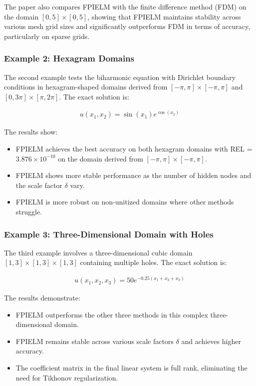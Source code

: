 \documentclass[11pt]{article}
\begin{document}
The paper also compares FPIELM with the finite difference method (FDM) on the domain $[0,5] \times [0,5]$, showing that FPIELM maintains stability across various mesh grid sizes and significantly outperforms FDM in terms of accuracy, particularly on sparse grids.

\subsubsection{Example 2: Hexagram Domains}

The second example tests the biharmonic equation with Dirichlet boundary conditions in hexagram-shaped domains derived from $[-\pi, \pi] \times [-\pi, \pi]$ and $[0, 3\pi] \times [\pi, 2\pi]$. The exact solution is:

\begin{align}
    u(x_1, x_2) = \sin(x_1) e^{\cos(x_2)}
\end{align}

The results show:
\begin{itemize}
    \item FPIELM achieves the best accuracy on both hexagram domains with REL = $3.876 \times 10^{-10}$ on the domain derived from $[-\pi, \pi] \times [-\pi, \pi]$.
    \item FPIELM shows more stable performance as the number of hidden nodes and the scale factor $\delta$ vary.
    \item FPIELM is more robust on non-unitized domains where other methods struggle.
\end{itemize}

\subsubsection{Example 3: Three-Dimensional Domain with Holes}

The third example involves a three-dimensional cubic domain $[1,3] \times [1,3] \times [1,3]$ containing multiple holes. The exact solution is:

\begin{align}
    u(x_1, x_2, x_3) = 50 e^{-0.25(x_1 + x_2 + x_3)}
\end{align}

The results demonstrate:
\begin{itemize}
    \item FPIELM outperforms the other three methods in this complex three-dimensional domain.
    \item FPIELM remains stable across various scale factors $\delta$ and achieves higher accuracy.
    \item The coefficient matrix in the final linear system is full rank, eliminating the need for Tikhonov regularization.
\end{itemize}
\end{document}
